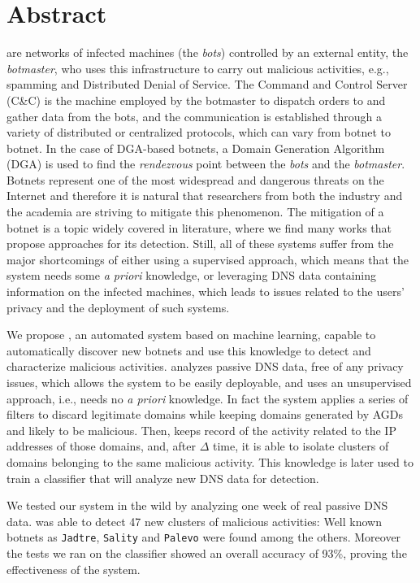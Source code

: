 

\chapter*{Abstract}
  are networks of infected machines (the \emph{bots}) controlled
by an external entity, the \emph{botmaster}, who uses this infrastructure to
carry out malicious activities, e.g., spamming and Distributed Denial of Service. The Command and Control Server (C\&C) is the machine
employed by the botmaster to dispatch orders to and gather data from the bots,
and the communication is established through a variety of distributed or
centralized protocols, which can vary from botnet to botnet. In the case of
DGA-based botnets, a Domain Generation Algorithm (DGA) is used to find the
\emph{rendezvous} point between the \emph{bots} and the \emph{botmaster}.
Botnets represent one of the most widespread and dangerous threats on the Internet and
therefore it is natural that researchers from both the industry and the academia
are striving to mitigate this phenomenon. The mitigation of a botnet
is a topic widely covered in literature, where we find many works that propose approaches
for its detection. Still, all of these systems suffer from the major
shortcomings of either using a supervised approach, which means that the system
needs some \emph{a priori} knowledge, or leveraging DNS data containing
information on the infected machines, which leads to issues related to the
users' privacy and the deployment of such systems.

We propose \thesystem, an automated system based on machine learning, capable to automatically discover new botnets and use this
knowledge to detect and characterize malicious activities. \thesystem analyzes passive
DNS data, free of any privacy issues, which allows the system to be easily
deployable, and uses an unsupervised approach, i.e., \thesystem needs no
\emph{a priori} knowledge. In fact the system applies a series of filters to
discard legitimate domains while keeping domains generated by AGDs and likely to be malicious. Then, \thesystem
keeps record of the activity related to the IP addresses of those domains, and,
after $\Delta$ time, it is able to isolate clusters of domains belonging to the same
malicious activity. This knowledge is later used to train a classifier that will analyze
new DNS data for detection.

We tested our system in the wild by analyzing one week of real passive DNS data.
\thesystem was able to detect 47 new clusters of malicious activities: Well
known botnets as \texttt{Jadtre}, \texttt{Sality} and \texttt{Palevo} were found among the others.
Moreover the tests we ran on the classifier showed an overall accuracy of 93\%, proving
the effectiveness of the system.



